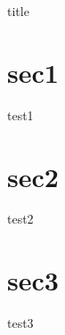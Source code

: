 \documentclass[10pt,a4j,report]{article}
\begin{document}
title

\section{sec1}
  test1
\section{sec2}
  test2
\section{sec3}
  test3

  
\end{document}
